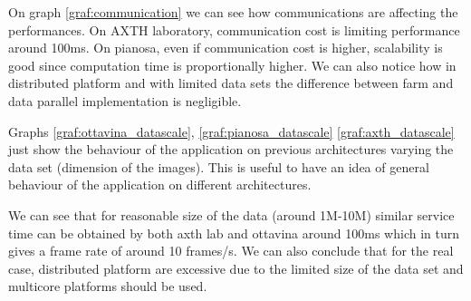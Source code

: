 On graph \ref{graf:communication} we can see how communications are affecting the performances.
On AXTH laboratory, communication cost is limiting performance around 100ms.
On pianosa, even if communication cost is higher, scalability is good since computation time is proportionally higher.
We can also notice how in distributed platform and with limited data sets the difference between farm and data parallel implementation is negligible.

Graphs \ref{graf:ottavina_datascale}, \ref{graf:pianosa_datascale} \ref{graf:axth_datascale} just show the behaviour of the application on previous architectures varying the data set (dimension of the images). 
This is useful to have an idea of general behaviour of the application on different architectures.

We can see that for reasonable size of the data (around 1M-10M) similar service time can be obtained by both axth lab and ottavina around 100ms which in turn gives a frame rate of around 10 frames/s.
We can also conclude that for the real case, distributed platform are excessive due to the limited size of the data set and multicore platforms should be used.